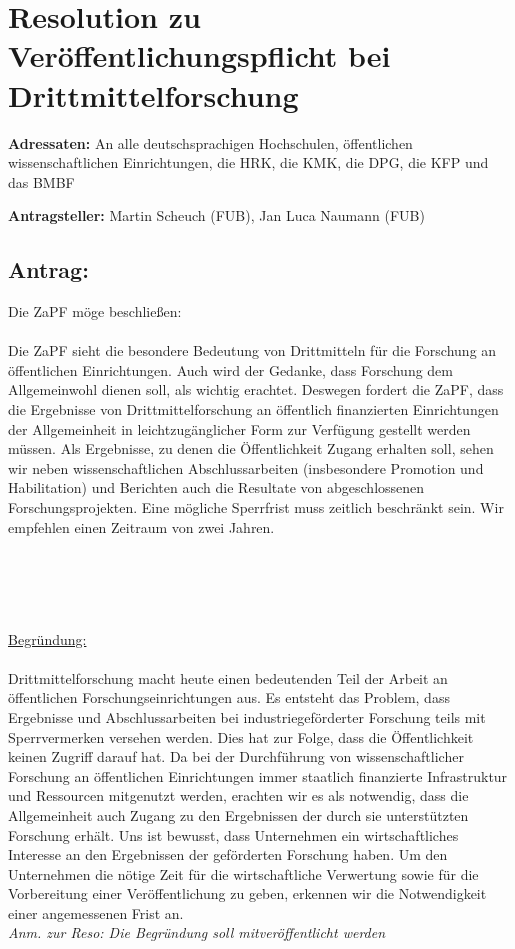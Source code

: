 \documentclass[DIV=9]{scrartcl}
\begin{document}
\section*{Resolution zu Veröffentlichungspflicht bei Drittmittelforschung}

\textbf{Adressaten:} An alle deutschsprachigen Hochschulen, öffentlichen wissenschaftlichen Einrichtungen, die HRK, die KMK, die DPG, die KFP und das BMBF

\textbf{Antragsteller:} Martin Scheuch (FUB), Jan Luca Naumann (FUB)

\subsection*{Antrag:}
Die ZaPF möge beschließen:\\\\

Die ZaPF sieht die besondere Bedeutung von Drittmitteln für die Forschung an öffentlichen Einrichtungen. Auch wird der Gedanke, dass Forschung dem Allgemeinwohl dienen soll, als wichtig erachtet. Deswegen fordert die ZaPF, dass die Ergebnisse von Drittmittelforschung an öffentlich finanzierten Einrichtungen der Allgemeinheit in leichtzugänglicher Form zur Verfügung gestellt werden müssen. Als Ergebnisse, zu denen die Öffentlichkeit Zugang erhalten soll, sehen wir neben wissenschaftlichen Abschlussarbeiten (insbesondere Promotion und Habilitation) und Berichten auch die Resultate von abgeschlossenen Forschungsprojekten. Eine mögliche Sperrfrist muss zeitlich beschränkt sein. Wir empfehlen einen Zeitraum von zwei Jahren.

~\\\\\\\\
\underline{Begründung:}\\\\
Drittmittelforschung macht heute einen bedeutenden Teil der Arbeit an öffentlichen Forschungseinrichtungen aus. Es entsteht das Problem, dass Ergebnisse und Abschlussarbeiten bei industriegeförderter Forschung teils mit Sperrvermerken versehen werden. Dies hat zur Folge, dass die Öffentlichkeit keinen Zugriff darauf hat. Da bei der Durchführung von wissenschaftlicher Forschung an öffentlichen Einrichtungen immer staatlich finanzierte Infrastruktur und Ressourcen mitgenutzt werden, erachten wir es als notwendig, dass die Allgemeinheit auch Zugang zu den Ergebnissen der durch sie unterstützten Forschung erhält. Uns ist bewusst, dass Unternehmen ein wirtschaftliches Interesse an den Ergebnissen der geförderten Forschung haben. Um den Unternehmen die nötige Zeit für die wirtschaftliche Verwertung sowie für die Vorbereitung einer Veröffentlichung zu geben, erkennen wir die Notwendigkeit einer angemessenen Frist an.\\

\emph{Anm. zur Reso: Die Begründung soll mitveröffentlicht werden}
\end{document}
